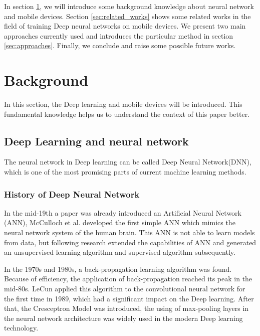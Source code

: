 \documentclass[article]{aaltoseries}
\begin{document}
In section \ref{sec:background}, we will introduce some background knowledge about neural network and mobile devices.
Section \ref{sec:related_works} shows some related works in the field of training Deep neural networks on mobile devices.
We present two main approaches currently used and introduces the particular method in section \ref{sec:approaches}.
Finally, we conclude and raise some possible future works.






\section{Background}
\label{sec:background}

In this section, the Deep learning and mobile devices will be introduced. This fundamental 
knowledge helps us to understand the context of this paper better.




\subsection{Deep Learning and neural network}

The neural network in Deep learning can be called Deep Neural Network(DNN), which is one of the most promising 
parts of current machine learning methods. 

\subsubsection{History of Deep Neural Network}

In the mid-19th a paper was already introduced an Artificial Neural Network (ANN)\cite{Warren1943}, 
McCulloch et al. developed the first simple ANN which mimics the neural network system of the human brain. This ANN is not
able to learn models from data, but following research extended the capabilities of ANN and generated an unsupervised 
learning algorithm and supervised algorithm subsequently.

In the 1970s and 1980s, a back-propagation learning algorithm was found. Because of efficiency, the application of back-propagation
reached its peak in the mid-80s. LeCun applied this algorithm to the convolutional neural network 
for the first time in 1989, which had a significant impact on the Deep learning. After that, the Cresceptron Model was introduced, 
the using of max-pooling layers in the neural network architecture was widely used in the modern Deep learning technology.
\end{document}
